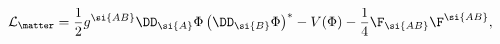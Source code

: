 \begin{equation}\label{eq:lag}
{\cal L}_{\matter} =
\frac{1}{2}g^{\si{AB}}\DD_{\si{A}}\Phi\left(\DD_{\si{B}}\Phi\right)^*
-V(\Phi)-\frac{1}{4}\F_{\si{AB}}\F^{\si{AB}},
\end{equation}

